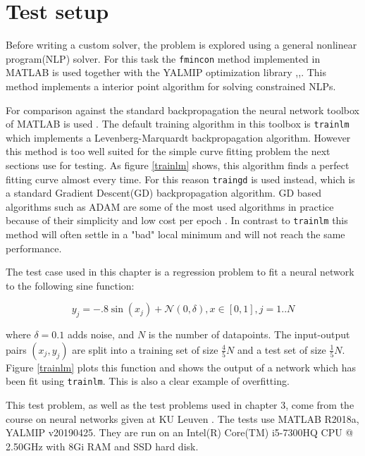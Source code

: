 \section{Test setup}
Before writing a custom solver, the problem is explored using a general nonlinear program(NLP) solver. For this task the \texttt{fmincon} method implemented in MATLAB is used together with the YALMIP optimization library \cite{fmincon},\cite{matlab},\cite{yalmip}. This method implements a interior point algorithm for solving constrained NLPs. 

For comparison against the standard backpropagation the neural network toolbox of MATLAB is used \cite{nntoolbox}. The default training algorithm in this toolbox is \texttt{trainlm} which implements a Levenberg-Marquardt backpropagation algorithm. However this method is too well suited for the simple curve fitting problem the next sections use for testing. As figure \ref{trainlm} shows, this algorithm finds a perfect fitting curve almost every time. For this reason \texttt{traingd} is used instead, which is a standard Gradient Descent(GD) backpropagation algorithm. GD based algorithms such as ADAM are some of the most used algorithms in practice because of their simplicity and low cost per epoch \cite{Goodfellow-et-al-2016}. In contrast to \texttt{trainlm} this method will often settle in a "bad" local minimum and will not reach the same performance.

The test case used in this chapter is a regression problem to fit a neural network to the following sine function:

\begin{equation}
y_j = -.8\sin(x_j) + \mathcal N(0,\delta), x \in [0,1], j = 1..N
\label{sin}
\end{equation}

where $\delta=0.1$ adds noise, and $N$ is the number of datapoints. The input-output pairs $(x_j,y_j)$ are split into a training set of size $\frac{4}{5}N$ and a test set of size $\frac{1}{5}N$. Figure \ref{trainlm} plots this function and shows the output of a network which has been fit using \texttt{trainlm}. This is also a clear example of overfitting.

This test problem, as well as the test problems used in chapter 3, come from the course on neural networks given at KU Leuven \cite{suykens2020}. The tests use MATLAB R2018a, YALMIP v20190425. They are run on an Intel(R) Core(TM) i5-7300HQ CPU @ 2.50GHz with 8Gi RAM and SSD hard disk. 

